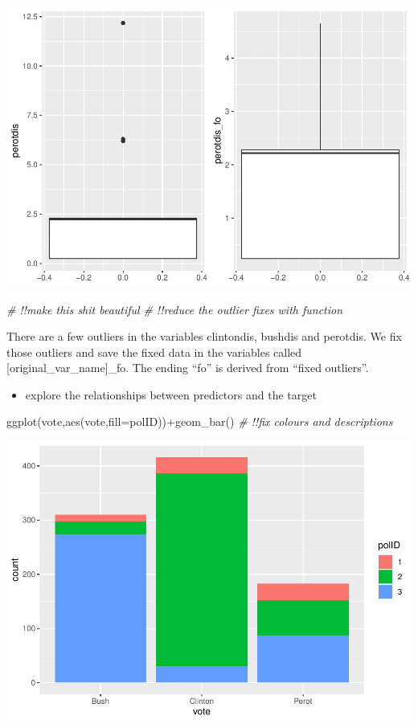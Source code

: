\documentclass[
]{article}
\newenvironment{Shaded}{\begin{snugshade}}{\end{snugshade}}
\newcommand{\AttributeTok}[1]{\textcolor[rgb]{0.77,0.63,0.00}{#1}}
\newcommand{\CommentTok}[1]{\textcolor[rgb]{0.56,0.35,0.01}{\textit{#1}}}
\newcommand{\FunctionTok}[1]{\textcolor[rgb]{0.00,0.00,0.00}{#1}}
\newcommand{\NormalTok}[1]{#1}
\newcommand{\SpecialCharTok}[1]{\textcolor[rgb]{0.00,0.00,0.00}{#1}}
\providecommand{\tightlist}{%
  \setlength{\itemsep}{0pt}\setlength{\parskip}{0pt}}
\begin{document}
\includegraphics{1992-US-election_files/figure-latex/unnamed-chunk-5-3.pdf}

\begin{Shaded}
\begin{Highlighting}[]
\CommentTok{\# !!make this shit beautiful}
\CommentTok{\# !!reduce the outlier fixes with function}
\end{Highlighting}
\end{Shaded}

There are a few outliers in the variables clintondis, bushdis and
perotdis. We fix those outliers and save the fixed data in the variables
called {[}original\_var\_name{]}\_fo. The ending ``fo'' is derived from
``fixed outliers''.

\begin{itemize}
\tightlist
\item
  explore the relationships between predictors and the target
\end{itemize}

\begin{Shaded}
\begin{Highlighting}[]
\FunctionTok{ggplot}\NormalTok{(vote,}\FunctionTok{aes}\NormalTok{(vote,}\AttributeTok{fill=}\NormalTok{polID))}\SpecialCharTok{+}\FunctionTok{geom\_bar}\NormalTok{() }\CommentTok{\# !!fix colours and descriptions}
\end{Highlighting}
\end{Shaded}

\includegraphics{1992-US-election_files/figure-latex/unnamed-chunk-6-1.pdf}
\end{document}
